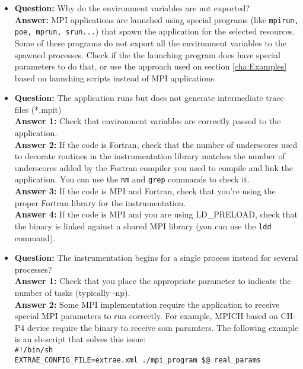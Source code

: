 \begin{itemize}

\item {\bf Question:} Why do the environment variables are not exported?\\
      {\bf Answer:  } MPI applications are launched using special programs (like {\tt mpirun, poe, mprun, srun...}) that spawn the application for the selected resources. Some of these programs do not export all the environment variables to the spawned processes. Check if the the launching program does have special parameters to do that, or use the approach used on section \ref{cha:Examples} based on launching scripts instead of MPI applications.

\item {\bf Question:} The application runs but does not generate intermediate trace files (*.mpit)\\
      {\bf Answer 1:} Check that environment variables are correctly passed to the application.\\
      {\bf Answer 2:} If the code is Fortran, check that the number of underscores used to decorate routines in the instrumentation library matches the number of underscores added by the Fortran compiler you used to compile and link the application. You can use the {\tt nm} and {\tt grep} commands to check it.\\
      {\bf Answer 3:} If the code is MPI and Fortran, check that you're using the proper Fortran library for the instrumentation.\\
      {\bf Answer 4:} If the code is MPI and you are using LD\_PRELOAD, check that the binary is linked against a shared MPI library (you can use the {\tt ldd} command).\\

\item {\bf Question:} The instrumentation begins for a single process instead for several processes?\\
      {\bf Answer 1:} Check that you place the appropriate parameter to indicate the number of tasks (typically -np).\\
      {\bf Answer 2:} Some MPI implementation require the application to receive special MPI parameters to run correctly. For example, MPICH based on CH-P4 device require the binary to receive som paramters. The following example is an sh-script that solves this issue:\\
      {\tt \#!/bin/sh\\
           EXTRAE\_CONFIG\_FILE=extrae.xml ./mpi\_program \$@ real\_params}\\


\end{itemize}

